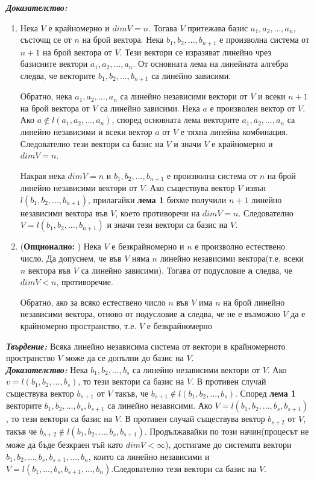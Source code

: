 \documentclass[11pt]{article} %
\newcommand{\italicBold}[1]{\textbf{\emph{#1}}}
\newcommand{\proof}{\italicBold{Доказателство: }}
\newcommand{\enumlet}{\renewcommand{\theenumi}{\alph{enumi}}}
\begin{document}
\proof \\
\enumlet
\begin{enumerate}
	\item Нека $V$ е крайномерно и $dimV = n$. Тогава $V$ притежава базис $a_{1}, a_{2}, ..., a_{n}$, състочщ се от $n$ на брой вектора. Нека $b_{1}, b_{2}, ..., b_{n+1}$ е произволна система от $n+1$ на брой вектора от $V$. Тези вектори се изразяват линейно чрез базисните вектори $a_{1}, a_{2}, ..., a_{n}$. От основната лема на линейната алгебра следва, че векторите $b_{1}, b_{2}, ..., b_{n+1}$ са линейно зависими. \par
		Обратно, нека $a_{1},a_{2},..., a_{n}$ са линейно независими вектори от $V$ и всеки $n+1$ на брой вектора от $V$ са линейно зависими. Нека $a$ е произволен вектор от $V$. Ако $a \not\in l(a_{1}, a_{2},...,a_{n})$, според основната лема векторите $a_{1}, a_{2},...,a_{n}$ са линейно независими и всеки вектор $a$ от $V$ е тяхна линейна комбинация. Следователно тези вектори са базис на $V$ и значи $V$ е крайномерно и $dimV = n$.\par
		Накрая нека $dimV = n$ и $b_{1}, b_{2}, ..., b_{n+1}$ е произволна система от $n$ на брой линейно независими вектори от $V$. Ако съществува вектор $V$ извън $l(b_{1}, b_{2}, ..., b_{n+1})$, прилагайки \textbf{лема 1} бихме получили $n+1$ линейно независими вектора във $V$, което противоречи на $dimV = n$. Следователно $V = l(b_{1}, b_{2}, ..., b_{n+1})$ и значи тези вектори са базис на $V$.\\
		\item (\textbf{Опционално: }) Нека $V$ е безкрайномерно и $n$ е произволно естествено число. Да допуснем, че във $V$ няма $n$ линейно независими вектора(т.е. всеки $n$ вектора във $V$ са линейно зависими). Тогава от подусловие \textbf{a} следва, че $dimV < n$, противоречие. \par
			Обратно, ако за всяко естествено число $n$ във $V$ има $n$ на брой линейно независими вектора, отново от подусловие \textbf{a} следва, че не е възможно $V$ да е крайномерно пространство, т.е. $V$ е безкрайномерно\\\par
\end{enumerate}


\italicBold{Твърдение: } Всяка линейно независима система от вектори в крайномерното пространство $V$ може да се допълни до базис на $V$.\\
\proof Нека $b_{1}, b_{2}, ..., b_{s}$ са линейно независими вектори от $V$. Ако $v = l(b_{1}, b_{2}, ..., b_{s})$, то тези вектори са базис на $V$. В противен случай съществува вектор $b_{s+1}$ от $V$ такъв, че $b_{s+1} \not\in l(b_{1}, b_{2}, ..., b_{s})$. Според \textbf{лема 1} векторите $b_{1}, b_{2}, ..., b_{s}, b_{s+1}$ са линейно независими. Ако $V = l(b_{1}, b_{2}, ..., b_{s}, b_{s+1})$, то тези вектори са базис на $V$. В противен случай съществува вектор $b_{s+2}$ от $V$, такъв че $b_{s+2} \not\in l(b_{1}, b_{2}, ..., b_{s}, b_{s+1})$. Продължавайки по този начин(процесът не може да бъде безкраен тъй като $dimV < \infty$), достигаме до системата вектори $b_{1}, b_{2}, ..., b_{s}, b_{s+1},...,b_{n}$, които са линейно независими и $V = l(b_{1}, ..., b_{s}, b_{s+1}, ..., b_{n})$.Следователно тези вектори са базис на $V$.
\end{document}
